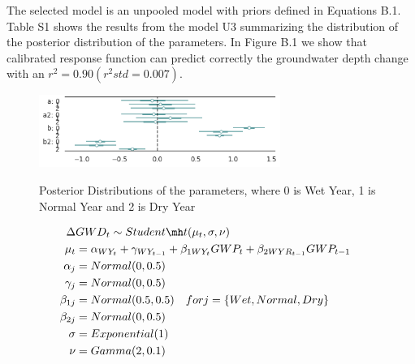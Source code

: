 \documentclass[11pt,a4paper]{article}
\begin{document}
The selected model is an unpooled model with priors defined in Equations B.1. Table S1 shows the results from the model U3 summarizing the distribution of the posterior distribution of the parameters. In Figure B.1 we show that calibrated response function can predict correctly the groundwater depth change with an $r^2 = 0.90 (r^2 std = 0.007)$. 

\begin{figure}[H]
\centering
\includegraphics[width=0.7\textwidth]{gw_depth_response_posterior_2.png}
\label{fig:mesh1}
\caption{Posterior Distributions of the parameters, where 0 is Wet Year, 1 is Normal Year and 2 is Dry Year}
\end{figure}

\begin{align}
\Delta & GWD_{t} \sim Student \mh t(\mu_{t},\sigma,\nu) & \notag\\
\mu_t & = \alpha_{WY_{t}} +  \gamma_{WY_{t-1}} + \beta_{1  WY_{t}}GWP_{t} + \beta_{2  WYR_{t-1}} GWP_{t-1} \notag\\
\alpha_j & = Normal(0 ,0.5)\notag\\
\gamma_j & = Normal(0,0.5)\\
\beta_{1j} & = Normal(0.5,0.5) \hspace{1em}  for j = \{Wet,Normal,Dry\} \notag\\
\beta_{2j} & = Normal(0,0.5) \notag\\
\sigma & = Exponential(1) \notag\\
\nu & = Gamma(2,0.1)\notag
\end{align}
\end{document}
